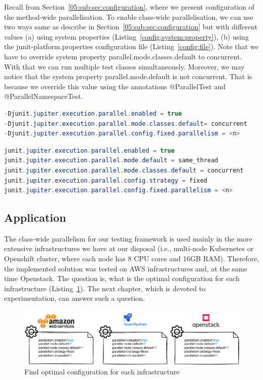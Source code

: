 Recall from Section~\ref{05:sub:sec:configuration}, where we present configuration of the method-wide parallelisation.
To enable class-wide parallelisation, we can use two ways same as describe in Section~\ref{05:sub:sec:configuration} but
with different values (a) using system properties (Listing~\ref{config:system:property}),
(b) using the junit-platform.properties configuration file (Listing~\ref{config:file}).
Note that we have to override system property parallel.mode.classes.default to concurrent.
With that we can run multiple test classes simultaneously.
Moreover, we may notice that the system property parallel.mode.default is not concurrent.
That is because we override this value using the annotations @ParallelTest and @ParallelNamespaceTest.
\begin{lstlisting}[language= Java,label=config:system:property,caption=(a) Configuration via system properties,frame=tb]
-Djunit.jupiter.execution.parallel.enabled = true
-Djunit.jupiter.execution.parallel.mode.classes.default= concurrent
-Djunit.jupiter.execution.parallel.config.fixed.parallelism = <n>
\end{lstlisting}
\begin{lstlisting}[language=Java,label=config:file,caption=(b) Configuration via file,frame = tb]
junit.jupiter.execution.parallel.enabled = true
junit.jupiter.execution.parallel.mode.default = same_thread
junit.jupiter.execution.parallel.mode.classes.default = concurrent
junit.jupiter.execution.parallel.config.strategy = fixed
junit.jupiter.execution.parallel.config.fixed.parallelism = <n>
\end{lstlisting}

\subsection{Application}
\label{05:class:wide:application}

The class-wide parallelism for our testing framework is used mainly in the more extensive infrastructures we have at our disposal
(i.e., multi-node Kubernetes or Openshift cluster, where each node has 8 CPU cores and 16GB RAM).
Therefore, the implemented solution was tested on AWS infrastructures and, at the same time Openstack.
The question is, what is the optimal configuration for each infrastructure (Listing~\ref{07:fig:optimal:configuration:infrastructure}).
The next chapter, which is devoted to experimentation, can answer such a question.

\begin{figure}[!ht]
\centering
\includegraphics[scale=0.9]{obrazky-figures/07-implementation/01-configuration}
\caption{Find optimal configuration for each infrastructure}
\label{07:fig:optimal:configuration:infrastructure}
\end{figure}
